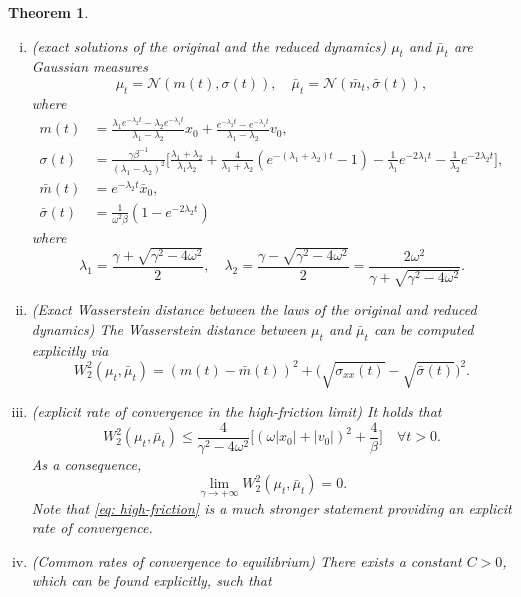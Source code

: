 \documentclass[a4paper,twoside]{article}      %
\newtheorem{theorem}{Theorem}[section]
\theoremstyle{definition}
\begin{document}
\begin{theorem} %
\begin{enumerate}[(i)]\
\item (exact solutions of the original and the reduced dynamics) $\mu_t$ and $\bar{\mu}_t$ are Gaussian measures 
\begin{equation}
\mu_t=\mathcal{N}(m(t),\sigma(t)),\quad \bar{\mu}_t=\mathcal{N}(\bar{m}_t,\bar{\sigma}(t)),
\end{equation}
where
\begin{align*}
m(t)&=\frac{\lambda_1 e^{-\lambda_2 t}-\lambda_2 e^{-\lambda_1 t}}{\lambda_1-\lambda_2}x_0+\frac{e^{-\lambda_2 t}-e^{-\lambda_1 t}}{\lambda_1-\lambda_2}v_0,\\
\sigma(t)&=\frac{\gamma \beta^{-1}}{(\lambda_1-\lambda_2)^2}\Big[\frac{\lambda_1+\lambda_2}{\lambda_1\lambda_2}+\frac{4}{\lambda_1+\lambda_2}(e^{-(\lambda_1+\lambda_2)t}-1)-\frac{1}{\lambda_1}e^{-2\lambda_1 t}-\frac{1}{\lambda_2}e^{-2\lambda_2 t}\Big],\\
\bar{m}(t)&=e^{-\lambda_2 t}\bar{x}_0,\\
\bar{\sigma}(t)&=\frac{1}{\omega^2 \beta}(1-e^{-2\lambda_2 t})
\end{align*}
where
\begin{equation}
\lambda_1=\frac{\gamma+\sqrt{\gamma^2-4\omega^2}}{2},\quad \lambda_2=\frac{\gamma-\sqrt{\gamma^2-4\omega^2}}{2}=\frac{2\omega^2}{\gamma+\sqrt{\gamma^2-4\omega^2}}.
\end{equation}
\item (Exact Wasserstein distance between the laws of the original and reduced dynamics) The Wasserstein distance between $\mu_t$ and $\bar{\mu}_t$ can be computed explicitly via
\begin{equation}
W_2^2(\mu_t,\bar{\mu}_t)=(m(t)-\bar{m}(t))^2+\Big(\sqrt{\sigma_{xx}(t)}-\sqrt{\bar{\sigma}(t)}\Big)^2.
\end{equation}
\item (explicit rate of convergence in the high-friction limit) It holds that
\begin{equation}
\label{eq: high-friction}
W_2^2(\mu_t,\bar{\mu}_t)\leq \frac{4}{\gamma^2-4\omega^2}\Big[(\omega |x_0|+|v_0|)^2+\frac{4}{\beta}\Big]\quad\forall t>0.
\end{equation}
As a consequence,
$$
\lim_{\gamma\rightarrow +\infty}W_2^2(\mu_t,\bar{\mu}_t)=0.
$$
Note that \eqref{eq: high-friction} is a much stronger statement providing an explicit rate of convergence.
\item (Common rates of convergence to equilibrium) There exists a constant $C>0$, which can be found explicitly, such that

\end{enumerate}
\end{theorem}
\end{document}
